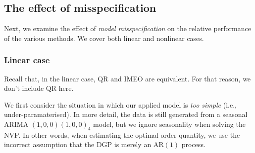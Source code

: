 \documentclass{article}
\begin{document}
\subsection{The effect of misspecification} \label{sub:exp3}

Next, we examine the effect of
\emph{model misspecification} on the relative performance of the various methods. We cover both linear and nonlinear cases.

\subsubsection{Linear case}

Recall that, in the linear case, QR and IMEO are equivalent. For that reason, we don't include QR here.

We first consider the situation in which our applied model is \emph{too simple} (i.e., under-paramaterised).
In more detail, the data is still generated from a seasonal ARIMA $(1,0,0)(1,0,0)_4$ model, but we ignore seasonality when solving the NVP. In other words, when estimating the optimal order quantity, we use the incorrect assumption that the DGP is merely an AR$(1)$ process.
\end{document}
